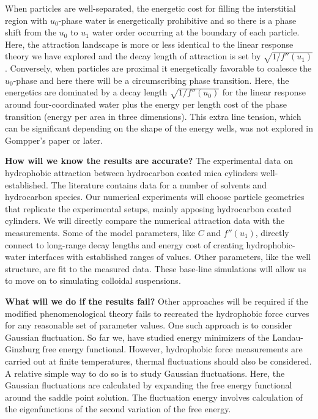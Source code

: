 When particles are well-separated, the energetic cost for filling
the interstitial region with $u_0$-phase water is energetically prohibitive
and so there is a phase shift from the $u_0$ to $u_1$ water order occurring
at the boundary of each particle.  Here, the attraction landscape is more
or less identical to the linear response theory we have explored and the
decay length of attraction is set by $\sqrt{1/f''(u_1)}$. Conversely, when
particles are proximal it energetically favorable to coalesce the $u_0$-phase
and here there will be a circumscribing phase transition.
Here, the energetics are dominated by a decay length  $\sqrt{1/f''(u_0)}$
for the linear response around four-coordinated water plus the energy 
per length cost of the phase transition (energy per area in three dimensions).
This extra line tension, which can be significant depending on the shape of the 
energy wells, was not explored in Gompper's paper or later. 

\textbf{How will we know the results are accurate?}
The experimental data on hydrophobic attraction between 
hydrocarbon coated mica cylinders well-established. 
The literature contains data for a number of solvents and hydrocarbon species.
Our numerical experiments will choose particle geometries that replicate the 
experimental setups, mainly apposing hydrocarbon coated cylinders. 
We will directly compare the numerical attraction data with the measurements.
Some of the model parameters, like $C$ and  $f''(u_1)$, directly connect 
to long-range decay lengths and energy cost of creating hydrophobic-water
interfaces with established ranges of values. Other parameters, like the
well structure, are fit to the measured data. These base-line simulations
will allow us to move on to simulating colloidal suspensions. 

\textbf{What will we do if the results fail?}
Other approaches will be required if the modified phenomenological theory 
fails to recreated the hydrophobic force curves for any reasonable 
set of parameter values.  One such approach is to consider 
Gaussian fluctuation. So far we, have studied energy minimizers of the
Landau-Ginzburg free energy functional. However,  hydrophobic force
measurements are carried out at finite 
temperatures, thermal fluctuations should also be considered. 
A relative simple way to do so is to study Gaussian fluctuations.
Here, the Gaussian fluctuations are calculated by expanding the 
free energy functional around the saddle point solution.
The fluctuation energy involves calculation of the eigenfunctions of
the second variation of the free energy. 

